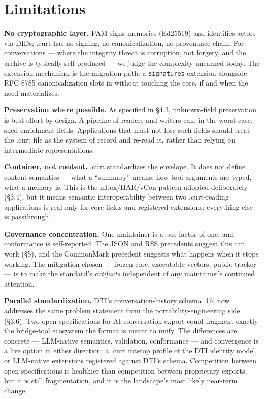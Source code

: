 \documentclass[11pt]{article}
\begin{document}
\section{Limitations}

\textbf{No cryptographic layer.} PAM signs memories (Ed25519) and identifies actors via DIDs; .curt has no signing, no canonicalization, no provenance chain. For conversations --- where the integrity threat is corruption, not forgery, and the archive is typically self-produced --- we judge the complexity unearned today. The extension mechanism is the migration path: a \texttt{signatures} extension alongside RFC 8785 canonicalization slots in without touching the core, if and when the need materializes.

\textbf{Preservation where possible.} As specified in \S4.3, unknown-field preservation is best-effort by design. A pipeline of readers and writers can, in the worst case, shed enrichment fields. Applications that must not lose such fields should treat the .curt file as the system of record and re-read it, rather than relying on intermediate representations.

\textbf{Container, not content.} .curt standardizes the envelope. It does not define content semantics --- what a ``summary'' means, how tool arguments are typed, what a memory is. This is the mbox/HAR/vCon pattern adopted deliberately (\S3.4), but it means semantic interoperability between two .curt-reading applications is real only for core fields and registered extensions; everything else is passthrough.

\textbf{Governance concentration.} One maintainer is a bus factor of one, and conformance is self-reported. The JSON and RSS precedents suggest this can work (\S5), and the CommonMark precedent suggests what happens when it stops working. The mitigation chosen --- frozen core, executable vectors, public tracker --- is to make the standard's \emph{artifacts} independent of any maintainer's continued attention.

\textbf{Parallel standardization.} DTI's conversation-history schema [16] now addresses the same problem statement from the portability-engineering side (\S3.6). Two open specifications for AI conversation export could fragment exactly the bridge-tool ecosystem the format is meant to unify. The differences are concrete --- LLM-native semantics, validation, conformance --- and convergence is a live option in either direction: a .curt interop profile of the DTI identity model, or LLM-native extensions registered against DTI's schema. Competition between open specifications is healthier than competition between proprietary exports, but it is still fragmentation, and it is the landscape's most likely near-term change.
\end{document}
